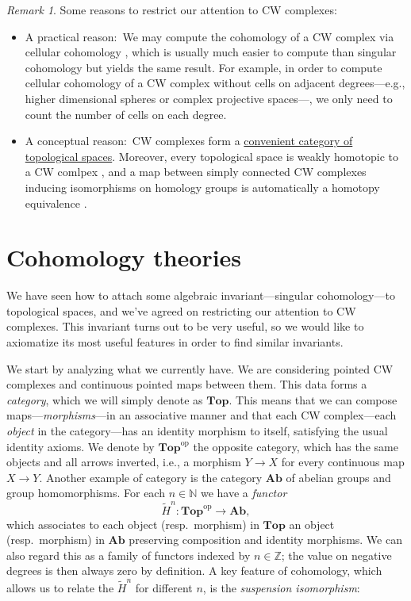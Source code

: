 \documentclass[12pt,a4paper]{amsart}
\theoremstyle{plain}
\theoremstyle{definition}
\theoremstyle{remark}
\newtheorem{rem}[thm]{Remark}
\begin{document}
\begin{rem}
  Some reasons to restrict our attention to CW complexes:

  \begin{itemize}
    \item A practical reason:~We may compute the cohomology of a CW complex via cellular cohomology \cite[p.~202]{hat02}, which is usually much easier to compute than singular cohomology but yields the same result.
      For example, in order to compute cellular cohomology of a CW complex without cells on adjacent degrees---e.g., higher dimensional spheres or complex projective spaces---, we only need to count the number of cells on each degree.
    \item A conceptual reason:~CW complexes form a \href{https://ncatlab.org/nlab/show/convenient+category+of+topological+spaces}{convenient category of topological spaces}.
      Moreover, every topological space is weakly homotopic to a CW comlpex \cite[Proposition 4.13]{hat02}, and a map between simply connected CW complexes inducing isomorphisms on homology groups is automatically a homotopy equivalence \cite[Corollary 4.33]{hat02}.
  \end{itemize}
\end{rem}

\section{Cohomology theories}\label{sec:cohomologies}

We have seen how to attach some algebraic invariant---singular cohomology---to topological spaces, and we've agreed on restricting our attention to CW complexes.
This invariant turns out to be very useful, so we would like to axiomatize its most useful features in order to find similar invariants.

We start by analyzing what we currently have.
We are considering pointed CW complexes and continuous pointed maps between them.
This data forms a \emph{category}, which we will simply denote as $\mathbf{Top}$.
This means that we can compose maps---\emph{morphisms}---in an associative manner and that each CW complex---each \emph{object} in the category---has an identity morphism to itself, satisfying the usual identity axioms.
We denote by $\mathbf{Top}^{\mathrm{op}}$ the opposite category, which has the same objects and all arrows inverted, i.e., a morphism $Y \to X$ for every continuous map $X \to Y$.
Another example of category is the category $\mathbf{Ab}$ of abelian groups and group homomorphisms.
For each $n \in \mathbb{N}$ we have a \emph{functor}
\[ \tilde{H}^{n} \colon \mathbf{Top}^{\mathrm{op}} \to \mathbf{Ab}, \]
which associates to each object (resp.~morphism) in $\mathbf{Top}$ an object (resp.~morphism) in $\mathbf{Ab}$ preserving composition and identity morphisms.
We can also regard this as a family of functors indexed by $n \in \mathbb{Z}$; the value on negative degrees is then always zero by definition.
A key feature of cohomology, which allows us to relate the $\tilde{H}^{n}$ for different $n$, is the \emph{suspension isomorphism}:
\end{document}
